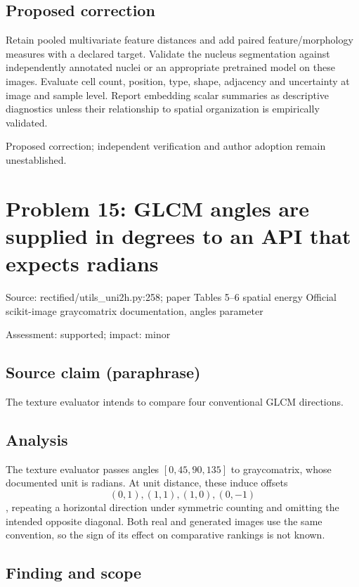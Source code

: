\documentclass[11pt]{article}
\begin{document}
\subsection*{Proposed correction}

Retain pooled multivariate feature distances and add paired feature/morphology measures with a declared target. Validate the nucleus segmentation against independently annotated nuclei or an appropriate pretrained model on these images. Evaluate cell count, position, type, shape, adjacency and uncertainty at image and sample level. Report embedding scalar summaries as descriptive diagnostics unless their relationship to spatial organization is empirically validated.

Proposed correction; independent verification and author adoption remain unestablished.

\section*{Problem 15: GLCM angles are supplied in degrees to an API that expects radians}

Source: rectified/utils\_uni2h.py:258; paper Tables 5–6 spatial energy Official scikit-image graycomatrix documentation, angles parameter

Assessment: supported; impact: minor

\subsection*{Source claim (paraphrase)}

The texture evaluator intends to compare four conventional GLCM directions.

\subsection*{Analysis}

The texture evaluator passes angles \([0,45,90,135]\) to graycomatrix, whose documented unit is radians. At unit distance, these induce offsets \[(0,1),(1,1),(1,0),(0,-1)\], repeating a horizontal direction under symmetric counting and omitting the intended opposite diagonal. Both real and generated images use the same convention, so the sign of its effect on comparative rankings is not known.

\subsection*{Finding and scope}
\end{document}
